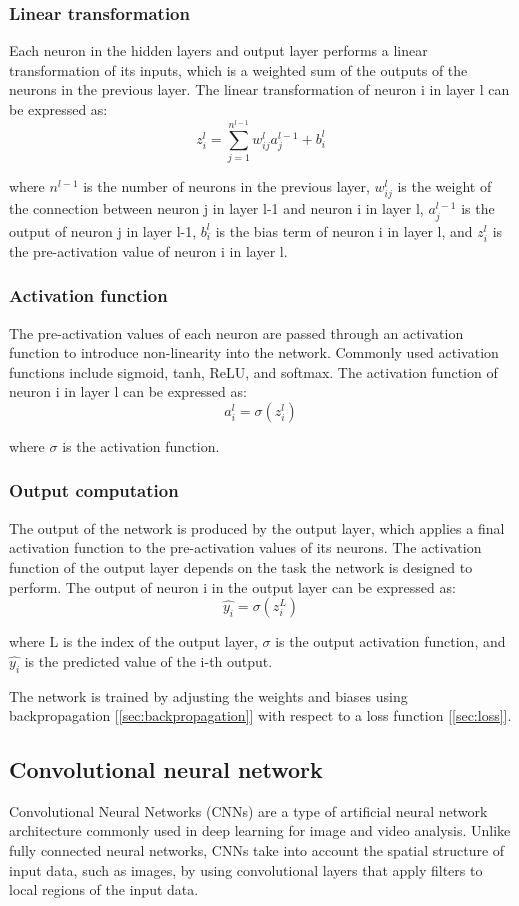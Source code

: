 \documentclass[a4paper]{sapthesis}
\begin{document}
\subsubsection{Linear transformation}
Each neuron in the hidden layers and output layer
 performs a linear transformation of its inputs, which is a weighted sum 
 of the outputs of the neurons in the previous layer. The linear 
 transformation of neuron i in layer l can be expressed as:
$$z_i^l = \sum_{j=1}^{n^{l-1}} w_{ij}^l a_j^{l-1} + b_i^l$$

where $n^{l-1}$ is the number of neurons in the previous layer,
 $w_{ij}^l$ is the weight of the connection between neuron j in layer 
 l-1 and neuron i in layer l, $a_j^{l-1}$ is the output of neuron j 
 in layer l-1, $b_i^l$ is the bias term of neuron i in layer l, and
  $z_i^l$ is the pre-activation value of neuron i in layer l.
  \subsubsection{Activation function}
The pre-activation values of each neuron are 
passed through an activation function to introduce non-linearity
 into the network. Commonly used activation functions include sigmoid,
  tanh, ReLU, and softmax. The activation function of neuron i in layer
l can be expressed as:
$$a_i^l = \sigma(z_i^l)$$

where $\sigma$ is the activation function.
\subsubsection{Output computation}
 The output of the network is produced by the output
 layer, which applies a final activation function to the pre-activation
  values of its neurons. The activation function of the output layer 
  depends on the task the network is designed to perform. The output of neuron i in the output layer can be expressed as:
$$\hat{y_i} = \sigma(z_i^L)$$

where L is the index of the output layer, $\sigma$ is the output activation
 function, and $\hat{y_i}$ is the predicted value of the i-th output.\newline

The network is trained by adjusting the weights and biases using
backpropagation [\ref{sec:backpropagation}] with respect to a loss function
 [\ref{sec:loss}].

\subsection{Convolutional neural network}
Convolutional Neural Networks (CNNs) are a type of artificial neural network
 architecture commonly used in deep learning for image and video analysis.
  Unlike fully connected neural networks, CNNs take into account the spatial
   structure of input data, such as images, by using convolutional layers 
   that apply filters to local regions of the input data.\newline
\end{document}
